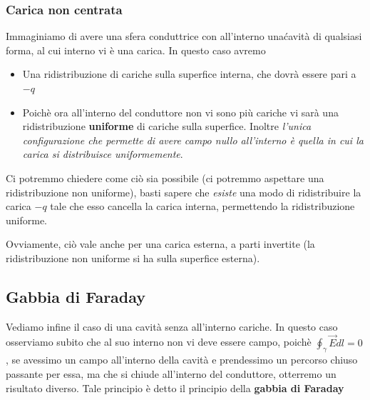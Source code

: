 \documentclass{book}
\begin{document}
\subsubsection{Carica non centrata}
Immaginiamo di avere una sfera conduttrice con all'interno una\' cavità di qualsiasi forma, al cui interno vi è una carica. In questo caso avremo
\begin{itemize}
  \item Una ridistribuzione di cariche sulla superfice interna, che dovrà essere pari a $-q$
  \item Poichè ora all'interno del conduttore non vi sono più cariche vi sarà una ridistribuzione \textbf{uniforme} di cariche sulla superfice. Inoltre
  \textit{l'unica configurazione che permette di avere campo nullo all'interno è quella in cui la carica si distribuisce uniformemente}.
\end{itemize}
Ci potremmo chiedere come ciò sia possibile (ci potremmo aspettare una ridistribuzione non uniforme), basti sapere che \textit{esiste} una modo di ridistribuire la carica $-q$
tale che esso cancella la carica interna, permettendo la ridistribuzione uniforme.

Ovviamente, ciò vale anche per una carica esterna, a parti invertite (la ridistribuzione non uniforme si ha sulla superfice esterna).

\begin{center}

\end{center}
\subsection{Gabbia di Faraday}
Vediamo infine il caso di una cavità senza all'interno cariche. In questo caso osserviamo subito che al suo interno non vi deve essere campo, poichè $\oint_\gamma \vec{E} dl=0$,
se avessimo un campo all'interno della cavità e prendessimo un percorso chiuso passante per essa, ma che si chiude all'interno del conduttore, otterremo un risultato diverso.
Tale principio è detto il principio della \textbf{gabbia di Faraday}
\end{document}
